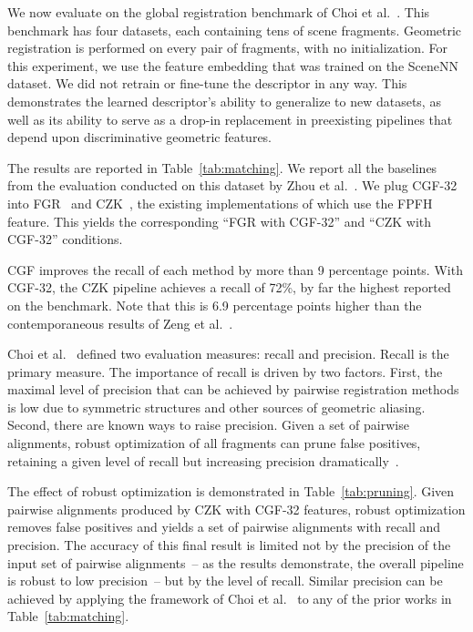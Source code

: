 We now evaluate on the global registration benchmark of Choi et al.~\cite{Choi2015}. This benchmark has four datasets, each containing tens of scene fragments. Geometric registration is performed on every pair of fragments, with no initialization. For this experiment, we use the feature embedding that was trained on the SceneNN dataset. We did not retrain or fine-tune the descriptor in any way. This demonstrates the learned descriptor's ability to generalize to new datasets, as well as its ability to serve as a drop-in replacement in preexisting pipelines that depend upon discriminative geometric features.

The results are reported in Table~\ref{tab:matching}. We report all the baselines from the evaluation conducted on this dataset by Zhou et al.~\cite{Zhou2016}. We plug CGF-32 into FGR~\cite{Zhou2016} and CZK~\cite{Choi2015}, the existing implementations of which use the FPFH feature. This yields the corresponding ``FGR with CGF-32'' and ``CZK with CGF-32'' conditions.

CGF improves the recall of each method by more than 9 percentage points. With \mbox{CGF-32}, the CZK pipeline achieves a recall of 72\%, by far the highest reported on the benchmark. Note that this is 6.9 percentage points higher than the contemporaneous results of Zeng et al.~\cite{Zeng2016}.



Choi et al.~\cite{Choi2015} defined two evaluation measures: recall and precision. Recall is the primary measure. The importance of recall is driven by two factors. First, the maximal level of precision that can be achieved by pairwise registration methods is low due to symmetric structures and other sources of geometric aliasing. Second, there are known ways to raise precision. Given a set of pairwise alignments, robust optimization of all fragments can prune false positives, retaining a given level of recall but increasing precision dramatically~\cite{Choi2015}.

The effect of robust optimization is demonstrated in Table~\ref{tab:pruning}. Given pairwise alignments produced by CZK with CGF-32 features, robust optimization removes false positives and yields a set of pairwise alignments with  recall and  precision. The accuracy of this final result is limited not by the precision of the input set of pairwise alignments~-- as the results demonstrate, the overall pipeline is robust to low precision~-- but by the level of recall. Similar precision can be achieved by applying the framework of Choi et al.~\cite{Choi2015} to any of the prior works in Table~\ref{tab:matching}.

